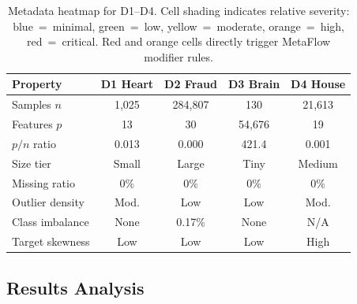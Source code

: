 \documentclass[conference]{llncs}
\begin{document}
   \begin{table}[ht]
   \centering
   \caption{Metadata heatmap for D1--D4. Cell shading indicates relative severity: \colorbox{blue!20}{blue}~=~minimal, \colorbox{green!25}{green}~=~low, \colorbox{yellow!40}{yellow}~=~moderate, \colorbox{orange!30}{orange}~=~high, \colorbox{red!25}{red}~=~critical. Red and orange cells directly trigger MetaFlow modifier rules.}
   \label{tab:metadata_heatmap}
   \footnotesize
   \setlength{\tabcolsep}{3pt}
   \renewcommand{\arraystretch}{1.25}
   \begin{tabular}{@{}l|cccc@{}}
   \hline
   \textbf{Property} & \textbf{D1 Heart} & \textbf{D2 Fraud} & \textbf{D3 Brain} & \textbf{D4 House} \\
   \hline
   Samples $n$      & \cellcolor{yellow!40}1,025   & \cellcolor{red!25}284,807 & \cellcolor{blue!20}130    & \cellcolor{orange!30}21,613 \\
   Features $p$     & \cellcolor{green!25}13      & \cellcolor{green!25}30    & \cellcolor{red!25}54,676  & \cellcolor{green!25}19     \\
   $p/n$ ratio      & \cellcolor{green!25}0.013   & \cellcolor{green!25}0.000 & \cellcolor{red!25}421.4   & \cellcolor{green!25}0.001  \\
   Size tier        & \cellcolor{yellow!40}Small  & \cellcolor{red!25}Large   & \cellcolor{blue!20}Tiny   & \cellcolor{orange!30}Medium \\
   Missing ratio    & \cellcolor{green!25}0\%     & \cellcolor{green!25}0\%   & \cellcolor{green!25}0\%   & \cellcolor{green!25}0\%    \\
   Outlier density  & \cellcolor{yellow!40}Mod.   & \cellcolor{green!25}Low   & \cellcolor{green!25}Low   & \cellcolor{yellow!40}Mod.  \\
   Class imbalance  & \cellcolor{green!25}None    & \cellcolor{red!25}0.17\% & \cellcolor{green!25}None  & \cellcolor{gray!20}N/A     \\
   Target skewness  & \cellcolor{green!25}Low     & \cellcolor{green!25}Low   & \cellcolor{green!25}Low   & \cellcolor{orange!30}High  \\
   \hline
   \end{tabular}
   \end{table}

   \subsection{Results Analysis}
\end{document}
